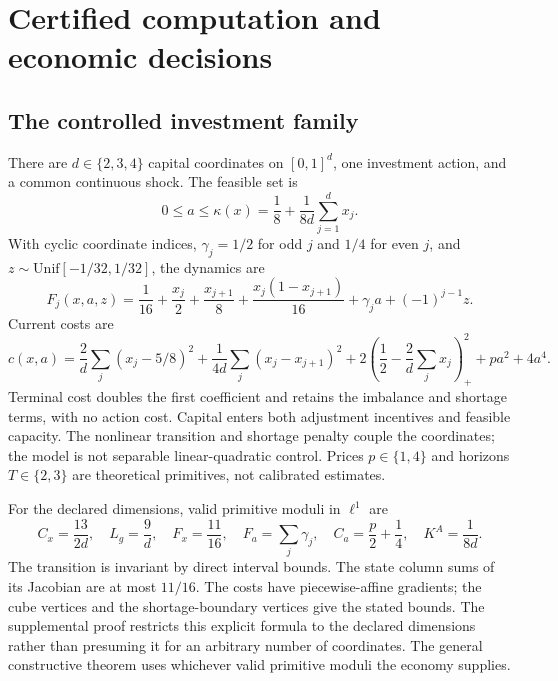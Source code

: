 \section{Certified computation and economic decisions}\label{sec:study49}
\subsection{The controlled investment family}
There are $d\in\{2,3,4\}$ capital coordinates on $[0,1]^d$, one investment action, and a common continuous shock. The feasible set is
\[
 0\le a\le\kappa(x)=\frac18+\frac1{8d}\sum_{j=1}^d x_j.
\]
With cyclic coordinate indices, $\gamma_j=1/2$ for odd $j$ and $1/4$ for even $j$, and $z\sim\mathrm{Unif}[-1/32,1/32]$, the dynamics are
\begin{equation}\label{eq:investment49}
 F_j(x,a,z)=\frac1{16}+\frac{x_j}2+\frac{x_{j+1}}8
       +\frac{x_j(1-x_{j+1})}{16}+\gamma_ja+(-1)^{j-1}z.
\end{equation}
Current costs are
\begin{equation}\label{eq:cost49}
 c(x,a)=\frac2d\sum_j(x_j-5/8)^2+
 \frac1{4d}\sum_j(x_j-x_{j+1})^2+
 2\left(\frac12-\frac2d\sum_jx_j\right)_+^2+pa^2+4a^4.
\end{equation}
Terminal cost doubles the first coefficient and retains the imbalance and shortage terms, with no action cost. Capital enters both adjustment incentives and feasible capacity. The nonlinear transition and shortage penalty couple the coordinates; the model is not separable linear-quadratic control. Prices $p\in\{1,4\}$ and horizons $T\in\{2,3\}$ are theoretical primitives, not calibrated estimates.

For the declared dimensions, valid primitive moduli in $\ell^1$ are
\[
 C_x=\frac{13}{2d},\quad L_g=\frac9d,\quad F_x=\frac{11}{16},\quad
 F_a=\sum_j\gamma_j,\quad C_a=\frac p2+\frac14,\quad K^A=\frac1{8d}.
\]
The transition is invariant by direct interval bounds. The state column sums of its Jacobian are at most $11/16$. The costs have piecewise-affine gradients; the cube vertices and the shortage-boundary vertices give the stated bounds. The supplemental proof restricts this explicit formula to the declared dimensions rather than presuming it for an arbitrary number of coordinates. The general constructive theorem uses whichever valid primitive moduli the economy supplies.

